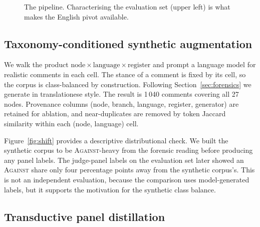 \documentclass{ceurart}
\begin{document}
\begin{figure}[t]
\caption{The pipeline. Characterising the evaluation set (upper left) is
what makes the English pivot available.}
\label{fig:pipeline}
\end{figure}

\subsection{Taxonomy-conditioned synthetic augmentation}
\label{sec:synth}

We walk the product $\text{node} \times \text{language} \times
\text{register}$ and prompt a language model for realistic comments in each
cell. The stance of a comment is fixed by its cell, so the corpus is
class-balanced by construction. Following Section~\ref{sec:forensics} we
generate in translationese style. The result is 1\,040 comments covering all
27 nodes. Provenance columns (node, branch, language, register, generator)
are retained for ablation, and near-duplicates are removed by token Jaccard
similarity within each (node, language) cell.

Figure~\ref{fig:shift} provides a descriptive distributional check. We built
the synthetic corpus to be \textsc{Against}-heavy from the forensic reading
before producing any panel labels. The judge-panel labels on the evaluation
set later showed an \textsc{Against} share only four percentage points away
from the synthetic corpus's. This is not
an independent evaluation, because the comparison uses model-generated
labels, but it supports the motivation for the synthetic class balance.

\subsection{Transductive panel distillation}
\label{sec:distil}
\end{document}
